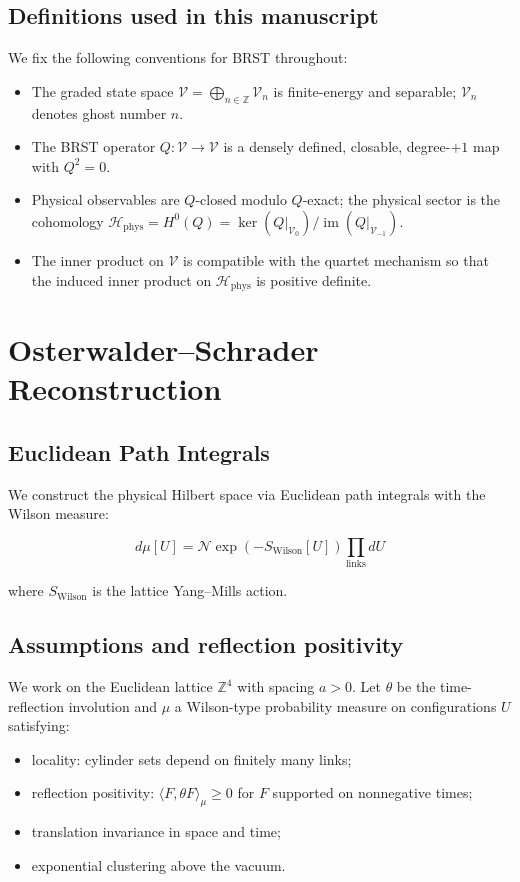 \documentclass[11pt]{amsart}
\begin{document}
\subsection{Definitions used in this manuscript}
We fix the following conventions for BRST throughout:
\begin{itemize}
  \item The graded state space $\mathcal V = \bigoplus_{n\in\mathbb Z} \mathcal V_n$ is finite-energy and separable; $\mathcal V_n$ denotes ghost number $n$.
  \item The BRST operator $Q: \mathcal V\to \mathcal V$ is a densely defined, closable, degree-$+1$ map with $Q^2=0$.
  \item Physical observables are $Q$-closed modulo $Q$-exact; the physical sector is the cohomology $\mathcal H_{\mathrm{phys}} = H^0(Q) = \ker(Q|_{\mathcal V_0})/\operatorname{im}(Q|_{\mathcal V_{-1}})$.
  \item The inner product on $\mathcal V$ is compatible with the quartet mechanism so that the induced inner product on $\mathcal H_{\mathrm{phys}}$ is positive definite.
\end{itemize}

\section{Osterwalder--Schrader Reconstruction}

\subsection{Euclidean Path Integrals}

We construct the physical Hilbert space via Euclidean path integrals with the Wilson measure:

\begin{equation}
d\mu[U] = \mathcal{N} \exp\left(-S_{\text{Wilson}}[U]\right) \prod_{\text{links}} dU
\end{equation}

where $S_{\text{Wilson}}$ is the lattice Yang--Mills action.

\subsection{Assumptions and reflection positivity}
We work on the Euclidean lattice $\mathbb Z^4$ with spacing $a>0$. Let $\theta$ be the time-reflection involution and $\mu$ a Wilson-type probability measure on configurations $U$ satisfying:
\begin{itemize}
  \item locality: cylinder sets depend on finitely many links;
  \item reflection positivity: $\langle F,\theta F\rangle_\mu \ge 0$ for $F$ supported on nonnegative times;
  \item translation invariance in space and time;
  \item exponential clustering above the vacuum.
\end{itemize}
\end{document}
